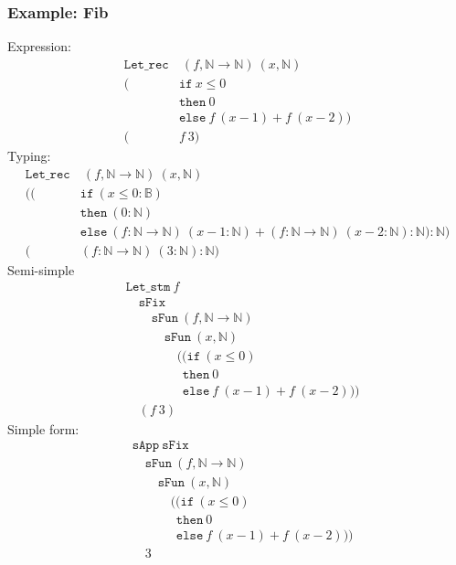 \documentclass[11pt, leqno]{article}
\theoremstyle{definition}
\begin{document}
\subsubsection{Example: Fib}
Expression:
\begin{align*}
\mathtt{Let\_rec}&~(f,\mathbb{N} \rightarrow \mathbb{N})~(x,\mathbb{N})~\\
  (&\mathtt{if}~x \leq 0\\
                 &\mathtt{then}~0\\
                 &\mathtt{else}~f~(x - 1) + f~(x-2))\\
  (&f~3)
\end{align*}
Typing:
\begin{align*}
\mathtt{Let\_rec}&~(f,\mathbb{N} \rightarrow \mathbb{N})~(x,\mathbb{N})~\\
  ((&\mathtt{if}~(x \leq 0 : \mathbb{B})\\
                 &\mathtt{then}~(0 : \mathbb{N})\\
                 &\mathtt{else}~(f : \mathbb{N} \rightarrow \mathbb{N})~(x - 1 : \mathbb{N}) + (f : \mathbb{N} \rightarrow \mathbb{N})~(x-2 : \mathbb{N}) : \mathbb{N}) : \mathbb{N})\\
  (&(f : \mathbb{N} \rightarrow \mathbb{N})~(3 : \mathbb{N}) : \mathbb{N})
\end{align*}
Semi-simple
\begin{align*}
  &\mathtt{Let\_stm}~f \\
  &\quad \mathtt{sFix} \\
  &\quad \quad \mathtt{sFun}~(f,\mathbb{N} \rightarrow \mathbb{N})\\
  &\quad \quad \quad \mathtt{sFun}~(x,\mathbb{N}) \\
  &\quad \quad \quad \quad ((\mathtt{if}~(x \leq 0)\\
  &\quad \quad \quad \quad ~~\mathtt{then}~0\\
  &\quad \quad \quad \quad ~~\mathtt{else}~f~(x - 1) + f~(x-2)))\\
  &\quad (f~3)
\end{align*}
Simple form:
\begin{align*}
  &\mathtt{sApp}~\mathtt{sFix} \\
  &\quad \mathtt{sFun}~(f,\mathbb{N} \rightarrow \mathbb{N})\\
  &\quad \quad \mathtt{sFun}~(x,\mathbb{N}) \\
  &\quad \quad \quad ((\mathtt{if}~(x \leq 0)\\
  &\quad \quad \quad ~~\mathtt{then}~0\\
  &\quad \quad \quad ~~\mathtt{else}~f~(x - 1) + f~(x-2))) \\
  &\quad 3
\end{align*}
\end{document}
